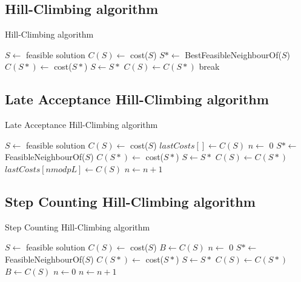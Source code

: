\documentclass[thesis=B,english]{FITthesis}[2012/10/20]
\begin{document}
        \subsection{Hill-Climbing algorithm}
\begin{algorithm}
\caption{Hill-Climbing algorithm}\label{hill-climb}
\begin{algorithmic}[1]
\State $S \gets$ feasible solution
\State $C(S) \gets$ cost($S$)
    \State $S* \gets$ BestFeasibleNeighbourOf($S$)
    \State $C(S*) \gets$ cost($S*$)
        \State $S \gets S*$
        \State $C(S) \gets C(S*)$
    \Else
        \State break
    \EndIf
\EndWhile
\EndProcedure
\end{algorithmic}
\end{algorithm}
\newpage
        \subsection{Late Acceptance Hill-Climbing algorithm}
\begin{algorithm}
\caption{Late Acceptance Hill-Climbing algorithm}\label{LAHC}
\begin{algorithmic}[1]
\State $S \gets$ feasible solution
\State $C(S) \gets$ cost($S$)
\State $lastCosts[] \gets C(S)$
\State $n \gets$ 0
    \State $S* \gets$ FeasibleNeighbourOf($S$)
    \State $C(S*) \gets$ cost($S*$)
        \State $S \gets S*$
        \State $C(S) \gets C(S*)$
    \EndIf
    \State $lastCosts[n mod pL] \gets C(S)$
    \State $n \gets n + 1$
\EndWhile
\EndProcedure
\end{algorithmic}
\end{algorithm}
\newpage
        \subsection{Step Counting Hill-Climbing algorithm}
\begin{algorithm}
\caption{Step Counting Hill-Climbing algorithm}\label{SCHC}
\begin{algorithmic}[1]
\State $S \gets$ feasible solution
\State $C(S) \gets$ cost($S$)
\State $B \gets C(S)$
\State $n \gets$ 0
    \State $S* \gets$ FeasibleNeighbourOf($S$)
    \State $C(S*) \gets$ cost($S*$)
        \State $S \gets S*$
        \State $C(S) \gets C(S*)$
    \EndIf
        \State $B \gets C(S)$
        \State $n \gets 0$
    \EndIf
    \State $n \gets n + 1$
\EndWhile
\EndProcedure
\end{algorithmic}
\end{algorithm}
\newpage
\end{document}
